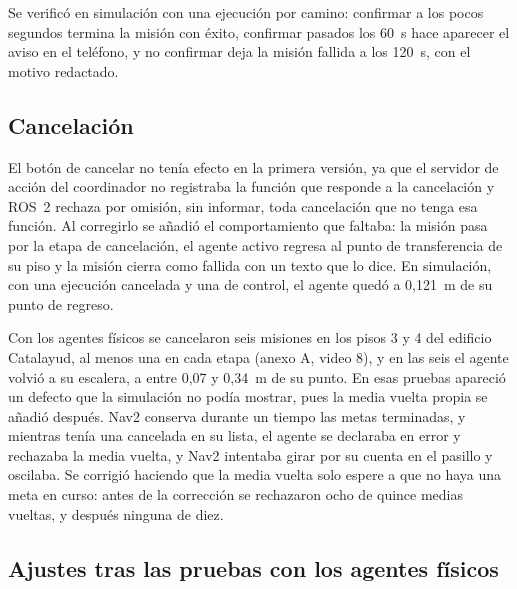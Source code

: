 Se verificó en simulación con una ejecución por camino: confirmar a los pocos segundos termina la misión con éxito, confirmar pasados los 60~s hace aparecer el aviso en el teléfono, y no confirmar deja la misión fallida a los 120~s, con el motivo redactado.


\subsection{Cancelación}

El botón de cancelar no tenía efecto en la primera versión, ya que el servidor de acción del coordinador no registraba la función que responde a la cancelación y ROS~2 rechaza por omisión, sin informar, toda cancelación que no tenga esa función. Al corregirlo se añadió el comportamiento que faltaba: la misión pasa por la etapa de cancelación, el agente activo regresa al punto de transferencia de su piso y la misión cierra como fallida con un texto que lo dice. En simulación, con una ejecución cancelada y una de control, el agente quedó a 0,121~m de su punto de regreso.

Con los agentes físicos se cancelaron seis misiones en los pisos 3 y 4 del edificio Catalayud, al menos una en cada etapa (anexo A, video 8), y en las seis el agente volvió a su escalera, a entre 0,07 y 0,34~m de su punto. En esas pruebas apareció un defecto que la simulación no podía mostrar, pues la media vuelta propia se añadió después. Nav2 conserva durante un tiempo las metas terminadas, y mientras tenía una cancelada en su lista, el agente se declaraba en error y rechazaba la media vuelta, y Nav2 intentaba girar por su cuenta en el pasillo y oscilaba. Se corrigió haciendo que la media vuelta solo espere a que no haya una meta en curso: antes de la corrección se rechazaron ocho de quince medias vueltas, y después ninguna de diez.

\subsection{Ajustes tras las pruebas con los agentes físicos}
\label{sec:ajustes-campo}

